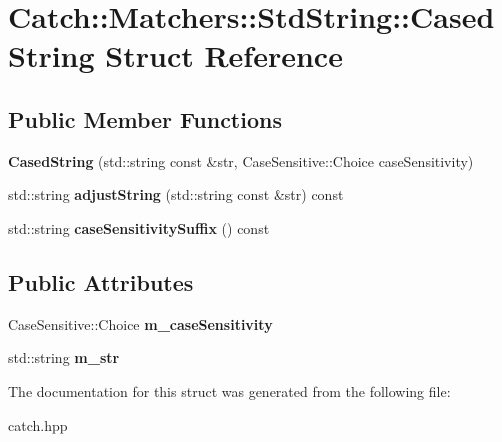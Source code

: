 \hypertarget{struct_catch_1_1_matchers_1_1_std_string_1_1_cased_string}{}\section{Catch\+:\+:Matchers\+:\+:Std\+String\+:\+:Cased\+String Struct Reference}
\label{struct_catch_1_1_matchers_1_1_std_string_1_1_cased_string}
\subsection*{Public Member Functions}
\begin{DoxyCompactItemize}
\item 
\mbox{\label{struct_catch_1_1_matchers_1_1_std_string_1_1_cased_string_aa88bbc5acd2bff22351d8d4b1816b561}} 
{\bfseries Cased\+String} (std\+::string const \&str, Case\+Sensitive\+::\+Choice case\+Sensitivity)
\item 
\mbox{\label{struct_catch_1_1_matchers_1_1_std_string_1_1_cased_string_a77639b1165c01f424ee0e96f53335010}} 
std\+::string {\bfseries adjust\+String} (std\+::string const \&str) const
\item 
\mbox{\label{struct_catch_1_1_matchers_1_1_std_string_1_1_cased_string_a9759155344d696b2476d764a1d95fcc9}} 
std\+::string {\bfseries case\+Sensitivity\+Suffix} () const
\end{DoxyCompactItemize}
\subsection*{Public Attributes}
\begin{DoxyCompactItemize}
\item 
\mbox{\label{struct_catch_1_1_matchers_1_1_std_string_1_1_cased_string_ae1c2864c986941536a6e94cca0528f92}} 
Case\+Sensitive\+::\+Choice {\bfseries m\+\_\+case\+Sensitivity}
\item 
\mbox{\label{struct_catch_1_1_matchers_1_1_std_string_1_1_cased_string_ad05dbc99aba3c3c386d6b856b213f911}} 
std\+::string {\bfseries m\+\_\+str}
\end{DoxyCompactItemize}


The documentation for this struct was generated from the following file\+:\begin{DoxyCompactItemize}
\item 
catch.\+hpp\end{DoxyCompactItemize}
